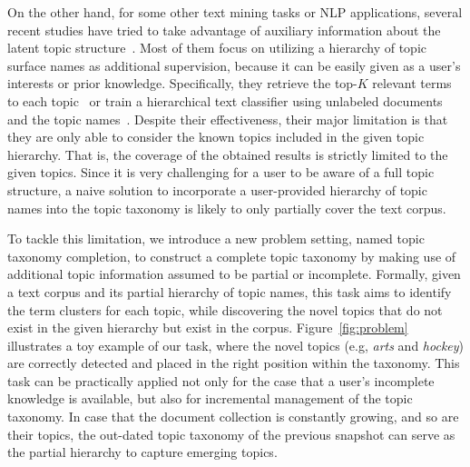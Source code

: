 On the other hand, for some other text mining tasks or NLP applications, several recent studies have tried to take advantage of auxiliary information about the latent topic structure~\cite{meng2020discriminative, meng2020hierarchical, meng2019weakly, shen2021taxoclass, huang2020weakly, meng2020text, meng2018weakly}.
Most of them focus on utilizing a hierarchy of topic surface names as additional supervision, because it can be easily given as a user's interests or prior knowledge.
Specifically, they retrieve the top-$K$ relevant terms to each topic~\cite{meng2020discriminative, meng2020hierarchical} or train a hierarchical text classifier using unlabeled documents and the topic names~\cite{meng2019weakly, shen2021taxoclass}.
Despite their effectiveness, their major limitation is that they are only able to consider the known topics included in the given topic hierarchy.
That is, the coverage of the obtained results is strictly limited to the given topics.
Since it is very challenging for a user to be aware of a full topic structure, a naive solution to incorporate a user-provided hierarchy of topic names into the topic taxonomy is likely to only partially cover the text corpus.

To tackle this limitation, we introduce a new problem setting, named topic taxonomy completion, to construct a complete topic taxonomy by making use of additional topic information assumed to be partial or incomplete. 
Formally, given a text corpus and its partial hierarchy of topic names, this task aims to identify the term clusters for each topic, while discovering the novel topics that do not exist in the given hierarchy but exist in the corpus.
Figure~\ref{fig:problem} illustrates a toy example of our task, where the novel topics (e.g, \textit{arts} and \textit{hockey}) are correctly detected and placed in the right position within the taxonomy.
This task can be practically applied not only for the case that a user's incomplete knowledge is available, but also for incremental management of the topic taxonomy.
In case that the document collection is constantly growing, and so are their topics, the out-dated topic taxonomy of the previous snapshot can serve as the partial hierarchy to capture emerging topics.

